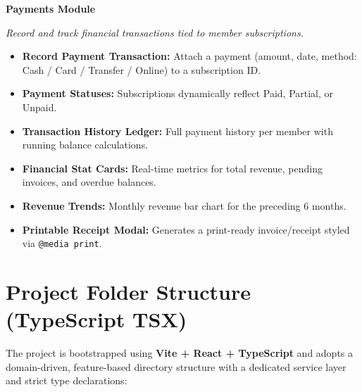 \documentclass[11pt,a4paper]{article}
\newcommand{\modulebox}[4]{%
\begin{tcolorbox}[
    enhanced,
    breakable,
    colback=primaryblue!2,
    colframe=primaryblue,
    arc=0.8mm,
    boxrule=0pt,
    leftrule=3.5pt,
    left=10pt, right=10pt, top=10pt, bottom=10pt
]
{\large\bfseries\color{primaryblue}\faIcon{#1}\; #2}\par
\vspace{4pt}
\small\textit{#3}
\vspace{6pt}
\begin{itemize}[leftmargin=*, itemsep=3pt, topsep=3pt]
#4
\end{itemize}
\end{tcolorbox}
\vspace{8pt}
}
\begin{document}
\modulebox{dollar-sign}{Payments Module}%
{Record and track financial transactions tied to member subscriptions.}{
  \item \textbf{Record Payment Transaction:} Attach a payment (amount, date, method: Cash / Card / Transfer / Online) to a subscription ID.
  \item \textbf{Payment Statuses:} Subscriptions dynamically reflect \textcolor{successgreen}{Paid}, \textcolor{warningyellow}{Partial}, or \textcolor{dangerred}{Unpaid}.
  \item \textbf{Transaction History Ledger:} Full payment history per member with running balance calculations.
  \item \textbf{Financial Stat Cards:} Real-time metrics for total revenue, pending invoices, and overdue balances.
  \item \textbf{Revenue Trends:} Monthly revenue bar chart for the preceding 6 months.
  \item \textbf{Printable Receipt Modal:} Generates a print-ready invoice/receipt styled via \texttt{@media print}.
}

\section{Project Folder Structure (TypeScript TSX)}

The project is bootstrapped using \textbf{Vite + React + TypeScript} and adopts a domain-driven, feature-based directory structure with a dedicated service layer and strict type declarations:
\end{document}
